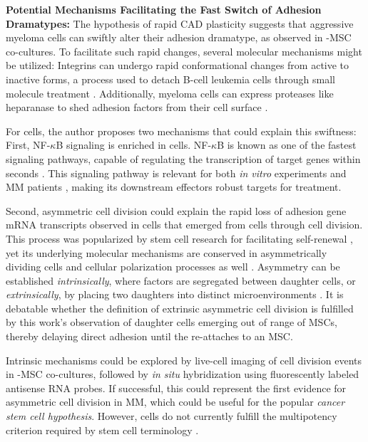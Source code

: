 \textbf{Potential Mechanisms Facilitating the Fast Switch of Adhesion Dramatypes:}
The hypothesis of rapid \ac{CAD} plasticity suggests that aggressive myeloma
cells can swiftly alter their adhesion dramatype, as observed in \INA-\ac{MSC}
co-cultures. To facilitate such rapid changes, several molecular mechanisms
might be utilized: Integrins can undergo rapid conformational changes from
active to inactive forms, a process used to detach B-cell leukemia cells through
small molecule treatment \cite{ruanVitroVivoEffects2022}. Additionally, myeloma
cells can express proteases like heparanase to shed adhesion factors from their
cell surface \cite{yangHeparanasePromotesSpontaneous2005}.

For \INA cells, the author proposes two mechanisms that could explain this
swiftness: First, NF-$\kappa$B signaling is enriched in \MAina cells.
NF-$\kappa$B is known as one of the fastest signaling pathways, capable of
regulating the transcription of target genes within seconds
\cite{gallego-sellesFastRegulationNFkB2022,
zarnegarNoncanonicalNFkBActivation2008}. This signaling pathway is relevant for
both \textit{in vitro} experiments and MM patients
\cite{sarinEvaluatingEfficacyMultiple2020}, making its downstream effectors
robust targets for treatment.

Second, asymmetric cell division could explain the rapid loss of adhesion gene
mRNA transcripts observed in \nMAina cells that emerged from \MAina cells
through cell division. This process was popularized by stem cell research for
facilitating self-renewal \cite{shenghuiMechanismsStemCell2009}, yet its
underlying molecular mechanisms are conserved in asymmetrically dividing
cells and cellular polarization processes as well \cite{inabaAsymmetricStemCell2012,
stjohnstonCellPolarityEggs2010}. Asymmetry can be established
\emph{intrinsically}, where factors are segregated between daughter cells, or
\emph{extrinsically}, by placing two daughters into distinct microenvironments
\cite{inabaAsymmetricStemCell2012}. It is debatable whether the definition of
extrinsic asymmetric cell division is fulfilled by this work’s observation of
\nMAina daughter cells emerging out of range of \acp{MSC}, thereby delaying
direct adhesion until the \nMAina re-attaches to an \ac{MSC}.

Intrinsic mechanisms could be explored by live-cell imaging of cell division
events in \INA-\ac{MSC} co-cultures, followed by \textit{in situ} hybridization
using fluorescently labeled antisense RNA probes. If successful, this could
represent the first evidence for asymmetric cell division in MM, which could be
useful for the popular \emph{cancer stem cell hypothesis}. However, \MAina cells
do not currently fulfill the multipotency criterion required by stem cell
terminology \cite{johnsenMyelomaStemCell2016, liAsymmetricCellDivision2022}.




